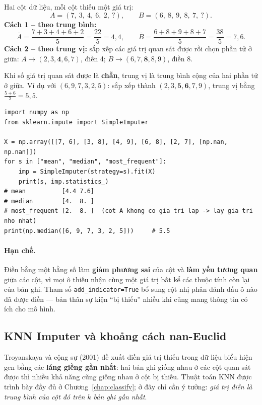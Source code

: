 \begin{example}
Hai cột dữ liệu, mỗi cột thiếu một giá trị:
\[
    A = (7,\ 3,\ 4,\ 6,\ 2,\ ?), \qquad B = (6,\ 8,\ 9,\ 8,\ 7,\ ?).
\]
\textbf{Cách 1 -- theo trung bình:}
\[
    \bar{A} = \frac{7 + 3 + 4 + 6 + 2}{5} = \frac{22}{5} = 4{,}4, \qquad
    \bar{B} = \frac{6 + 8 + 9 + 8 + 7}{5} = \frac{38}{5} = 7{,}6.
\]
\textbf{Cách 2 -- theo trung vị:} sắp xếp các giá trị quan sát được rồi chọn phần tử ở giữa:
$A \to (2, 3, \mathbf{4}, 6, 7)$, điền 4; \quad $B \to (6, 7, \mathbf{8}, 8, 9)$, điền 8.

Khi số giá trị quan sát được là \textbf{chẵn}, trung vị là trung bình cộng của hai phần tử ở giữa. Ví dụ với $(6, 9, 7, 3, 2, 5)$: sắp xếp thành $(2, 3, \mathbf{5}, \mathbf{6}, 7, 9)$, trung vị bằng $\frac{5 + 6}{2} = 5{,}5$.
\end{example}

\begin{lstlisting}[caption={SimpleImputer với ví dụ trên}]
import numpy as np
from sklearn.impute import SimpleImputer

X = np.array([[7, 6], [3, 8], [4, 9], [6, 8], [2, 7], [np.nan, np.nan]])
for s in ["mean", "median", "most_frequent"]:
    imp = SimpleImputer(strategy=s).fit(X)
    print(s, imp.statistics_)
# mean          [4.4 7.6]
# median        [4.  8. ]
# most_frequent [2.  8. ]  (cot A khong co gia tri lap -> lay gia tri nho nhat)
print(np.median([6, 9, 7, 3, 2, 5]))     # 5.5
\end{lstlisting}

\paragraph{Hạn chế.} Điền bằng một hằng số làm \textbf{giảm phương sai} của cột và \textbf{làm yếu tương quan} giữa các cột, vì mọi ô thiếu nhận cùng một giá trị bất kể các thuộc tính còn lại của bản ghi. Tham số \texttt{add\_indicator=True} bổ sung cột nhị phân đánh dấu ô nào đã được điền --- bản thân sự kiện ``bị thiếu'' nhiều khi cũng mang thông tin có ích cho mô hình.

\subsection{KNN Imputer và khoảng cách nan-Euclid}

Troyanskaya và cộng sự (2001) đề xuất điền giá trị thiếu trong dữ liệu biểu hiện gen bằng các \textbf{láng giềng gần nhất}: hai bản ghi giống nhau ở các cột quan sát được thì nhiều khả năng cũng giống nhau ở cột bị thiếu. Thuật toán KNN được trình bày đầy đủ ở Chương~\ref{chap:classify}; ở đây chỉ cần ý tưởng: \textit{giá trị điền là trung bình của cột đó trên $k$ bản ghi gần nhất}.

